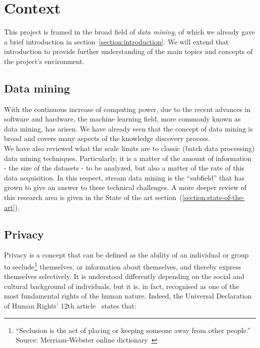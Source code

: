 \section{Context}
\label{section:context}

This project is framed in the broad field of \textit{data mining}, of which we already gave a brief introduction in section~\ref{section:introduction}. We will extend that introduction to provide further understanding of the main topics and concepts of the project’s environment.

\subsection{Data mining}

With the continuous increase of computing power, due to the recent advances in software and hardware, the machine learning field, more commonly known as data mining, has arisen. We have already seen that the concept of data mining is broad and covers many aspects of the knowledge discovery process.\\

We have also reviewed what the scale limits are to classic (batch data processing) data mining techniques. Particularly, it is a matter of the amount of information - the size of the datasets - to be analyzed, but also a matter of the rate of this data acquisition. In this respect, stream data mining is the “subfield” that has grown to give an answer to these technical challenges. A more deeper review of this research area is given in the State of the art section~(\ref{section:state-of-the-art}).

\subsection{Privacy}

Privacy is a concept that can be defined as the ability of an individual or group to seclude\footnote{“Seclusion is the act of placing or keeping someone away from other people.” Source: Merriam-Webster online dictionary~\cite{website:merriamSeclusion}} themselves, or information about themselves, and thereby express themselves selectively. It is understood differently depending on the social and cultural background of individuals, but it is, in fact, recognised as one of the most fundamental rights of the human nature. Indeed, the Universal Declaration of Human Rights’ 12th article~\cite{website:humanRights} states that:

